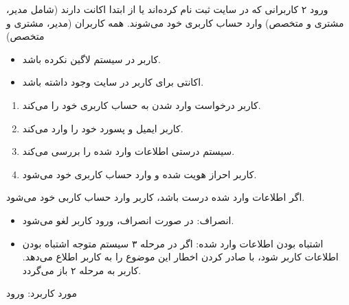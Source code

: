 \usecase
{ورود}
{۲}
{کاربرانی که در سایت ثبت‌ نام کرده‌اند یا از ابتدا اکانت دارند (شامل مدیر، مشتری و متخصص) وارد حساب کاربری خود می‌شوند.}
{همه کاربران (مدیر، مشتری و متخصص)}
{}
{
		\begin{itemize}
		\item
		کاربر در سیستم لاگین نکرده باشد.
		\item
		اکانتی برای کاربر در سایت وجود داشته باشد.
	\end{itemize}
	
}
{
\begin{enumerate}
	\item 
	کاربر درخواست وارد شدن به حساب کاربری خود را می‌کند.
	
	
	\item 
	کاربر ایمیل و پسورد خود را وارد می‌کند.
	
	\item
	سیستم درستی اطلاعات وارد شده را بررسی می‌کند.
	
	\item
	کاربر احراز هویت شده و وارد حساب کاربری خود می‌شود.
\end{enumerate}
}{اگر اطلاعات وارد شده درست باشد، کاربر وارد حساب کاربی خود می‌شود.}
{	
	
	\begin{itemize}
	\item
	 انصراف: در صورت انصراف، ورود کاربر لغو می‌شود.
	
	\item
	اشتباه بودن اطلاعات وارد شده: اگر در مرحله ۳ سیستم متوجه اشتباه بودن اطلاعات کاربر شود، با صادر کردن اخطار این موضوع را به کاربر اطلاع می‌دهد. کاربر به مرحله ۲ باز می‌گردد.
	\end{itemize}
}
{مورد کاربرد: ورود }



